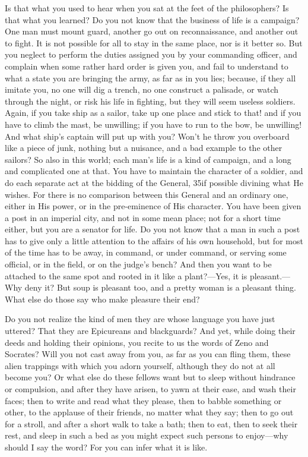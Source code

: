 Is that what you used to hear when you sat at the feet of the philosophers? Is that what you learned? Do you not know that the business of life is a campaign? One man must mount guard, another go out on reconnaissance, and another out to fight. It is not possible for all to stay in the same place, nor is it better so. But you neglect to perform the duties assigned you by your commanding officer, and complain when some rather hard order is given you, and fail to understand to what a state you are bringing the army, as far as in you lies; because, if they all imitate you, no one will dig a trench, no one construct a palisade, or watch through the night, or risk his life in fighting, but they will seem useless soldiers. Again, if you take ship as a sailor, take up one place and stick to that! and if you have to climb the mast, be unwilling; if you have to run to the bow, be unwilling! And what ship's captain will put up with you? Won't he throw you overboard like a piece of junk, nothing but a nuisance, and a bad example to the other sailors? So also in this world; each man's life is a kind of campaign, and a long and complicated one at that. You have to maintain the character of a soldier, and do each separate act at the bidding of the General, 35if possible divining what He wishes. For there is no comparison between this General and an ordinary one, either in His power, or in the pre-eminence of His character. You have been given a post in an imperial city, and not in some mean place; not for a short time either, but you are a senator for life. Do you not know that a man in such a post has to give only a little attention to the affairs of his own household, but for most of the time has to be away, in command, or under command, or serving some official, or in the field, or on the judge's bench? And then you want to be attached to the same spot and rooted in it like a plant?—Yes, it is pleasant.—Why deny it? But soup is pleasant too, and a pretty woman is a pleasant thing. What else do those say who make pleasure their end?

Do you not realize the kind of men they are whose language you have just uttered? That they are Epicureans and blackguards? And yet, while doing their deeds and holding their opinions, you recite to us the words of Zeno and Socrates? Will you not cast away from you, as far as you can fling them, these alien trappings with which you adorn yourself, although they do not at all become you? Or what else do these fellows want but to sleep without hindrance or compulsion, and after they have arisen, to yawn at their ease, and wash their faces; then to write and read what they please, then to babble something or other, to the applause of their friends, no matter what they say; then to go out for a stroll, and after a short walk to take a bath; then to eat, then to seek their rest, and sleep in such a bed as you might expect such persons to enjoy—why should I say the word? For you can infer what it is like.

